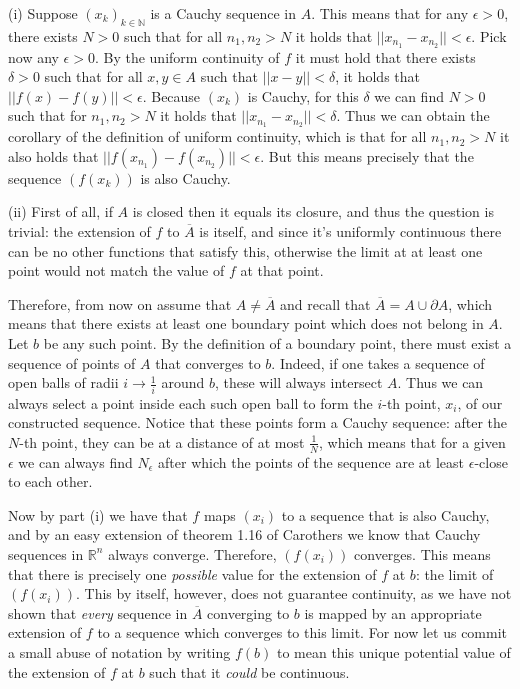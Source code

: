 \begin{solution}

    (i) Suppose $(x_k)_{k \in \mathbb{N}}$ is a Cauchy sequence in $A$. This means that for any $\epsilon > 0$, there exists $N > 0$ such that for all $n_1, n_2 > N$ it holds that $\lvert \lvert x_{n_1} - x_{n_2} \rvert \rvert < \epsilon$. Pick now any $\epsilon > 0$. By the uniform continuity of $f$ it must hold that there exists $\delta > 0$ such that for all $x, y \in A$ such that $\lvert \lvert x -y \rvert \rvert < \delta$, it holds that $\lvert \lvert f(x) - f(y) \rvert \rvert < \epsilon$. Because $(x_k)$ is Cauchy, for this $\delta$ we can find $N > 0$ such that for $n_1, n_2 > N$ it holds that $\lvert \lvert x_{n_1} - x_{n_2} \rvert \rvert < \delta$. Thus we can obtain the corollary of the definition of uniform continuity, which is that for all $n_1, n_2 > N$ it also holds that $\lvert \lvert f(x_{n_1}) - f(x_{n_2}) \rvert \rvert < \epsilon$. But this means precisely that the sequence $(f(x_k))$ is also Cauchy.

    (ii) First of all, if $A$ is closed then it equals its closure, and thus the question is trivial: the extension of $f$ to $\overline{A}$ is itself, and since it's uniformly continuous there can be no other functions that satisfy this, otherwise the limit at at least one point would not match the value of $f$ at that point. 
    
    Therefore, from now on assume that $A \neq \overline{A}$ and recall that $\overline{A} = A \cup \partial A$, which means that there exists at least one boundary point which does not belong in $A$. Let $b$ be any such point. By the definition of a boundary point, there must exist a sequence of points of $A$ that converges to $b$. Indeed, if one takes a sequence of open balls of radii $i \rightarrow \frac{1}{i}$ around $b$, these will always intersect $A$. Thus we can always select a point inside each such open ball to form the $i$-th point, $x_i$, of our constructed sequence. Notice that these points form a Cauchy sequence: after the $N$-th point, they can be at a distance of at most $\frac{1}{N}$, which means that for a given $\epsilon$ we can always find $N_\epsilon$ after which the points of the sequence are at least $\epsilon$-close to each other.

    Now by part (i) we have that $f$ maps $(x_i)$ to a sequence that is also Cauchy, and by an easy extension of theorem 1.16 of Carothers we know that Cauchy sequences in $\mathbb{R}^n$ always converge. Therefore, $(f(x_i))$ converges. This means that there is precisely one \textit{possible} value for the extension of $f$ at $b$: the limit of $(f(x_i))$. This by itself, however, does not guarantee continuity, as we have not shown that \textit{every} sequence in $\overline{A}$ converging to $b$ is mapped by an appropriate extension of $f$ to a sequence which converges to this limit. For now let us commit a small abuse of notation by writing $f(b)$ to mean this unique potential value of the extension of $f$ at $b$ such that it \textit{could} be continuous.


\end{solution}
